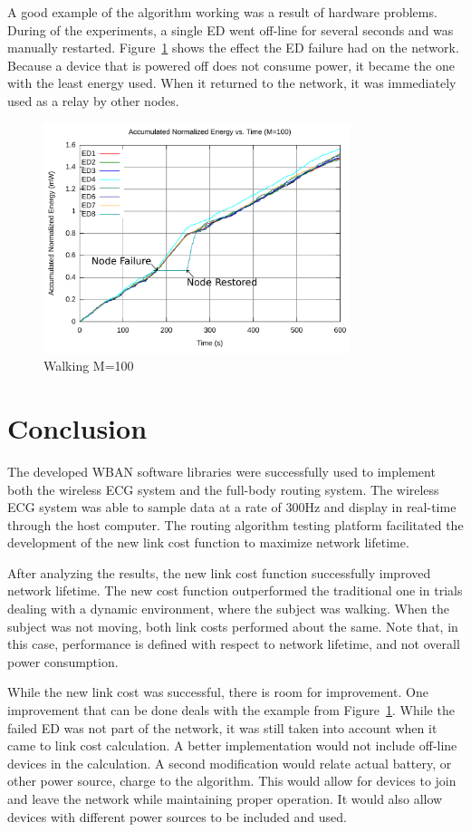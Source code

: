 \documentclass{article}
\begin{document}
A good example of the algorithm working was a result of hardware problems. During of the experiments, a single ED went off-line for several seconds and was manually restarted. Figure~\ref{fig:walk4-c100} shows the effect the ED failure had on the network. Because a device that is powered off does not consume power, it became the one with the least energy used. When it returned to the network, it was immediately used as a relay by other nodes.

\begin{figure}[!ht]
\includegraphics[width=0.8\textwidth]{figures/walk4-c100.pdf}
\caption{Walking M=100}
\label{fig:walk4-c100}
\end{figure}

\section{Conclusion}
The developed WBAN software libraries were successfully used to implement both the wireless ECG system and the full-body routing system. The wireless ECG system was able to sample data at a rate of 300Hz and display in real-time through the host computer. The routing algorithm testing platform facilitated the development of the new link cost function to maximize network lifetime.

After analyzing the results, the new link cost function successfully improved network lifetime. The new cost function outperformed the traditional one in trials dealing with a dynamic environment, where the subject was walking. When the subject was not moving, both link costs performed about the same. Note that, in this case, performance is defined with respect to network lifetime, and not overall power consumption.

While the new link cost was successful, there is room for improvement. One improvement that can be done deals with the example from Figure~\ref{fig:walk4-c100}. While the failed ED was not part of the network, it was still taken into account when it came to link cost calculation. A better implementation would not include off-line devices in the calculation. A second modification would relate actual battery, or other power source, charge to the algorithm. This would allow for devices to join and leave the network while maintaining proper operation. It would also allow devices with different power sources to be included and used.
\end{document}

